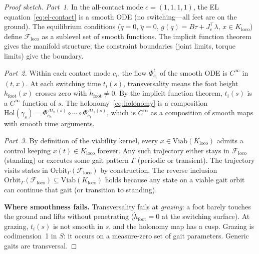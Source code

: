 \documentclass[11pt,a4paper]{article}
\newcommand{\cF}{\mathcal{F}}
\begin{document}
\begin{proof}[Proof sketch]
\emph{Part~1.}\;
In the all-contact mode $c = (1,1,1,1)$,
the EL equation~\eqref{eq:el-contact}
is a smooth ODE
(no switching---all feet are on the ground).
The equilibrium conditions
($\dot{q} = 0$, $\ddot{q} = 0$,
$g(q) = B\tau + J_c^\top\lambda$,
$x \in K_{\mathrm{loco}}$)
define $\cF_{\mathrm{loco}}$
as a sublevel set of smooth functions.
The implicit function theorem gives the manifold structure;
the constraint boundaries (joint limits, torque limits)
give the boundary.

\medskip\noindent
\emph{Part~2.}\;
Within each contact mode $c_i$,
the flow $\Phi_{c_i}^t$ of the smooth ODE
is $C^\infty$ in $(t, x)$.
At each switching time $t_i(s)$,
transversality means the foot height
$h_{\mathrm{foot}}(x)$ crosses zero
with $\dot{h}_{\mathrm{foot}} \neq 0$.
By the implicit function theorem,
$t_i(s)$ is a $C^\infty$ function of $s$.
The holonomy~\eqref{eq:holonomy}
is a composition
$\mathrm{Hol}(\gamma_s)
  = \Phi_{c_n}^{\Delta t_n(s)}
    \circ \cdots \circ
    \Phi_{c_1}^{\Delta t_1(s)}$,
which is $C^\infty$ as a composition
of smooth maps with smooth time arguments.

\medskip\noindent
\emph{Part~3.}\;
By definition of the viability kernel,
every $x \in \mathrm{Viab}(K_{\mathrm{loco}})$
admits a control keeping $x(t) \in K_{\mathrm{loco}}$
forever.
Any such trajectory either stays in
$\cF_{\mathrm{loco}}$ (standing)
or executes some gait pattern $\Gamma$
(periodic or transient).
The trajectory visits states in
$\mathrm{Orbit}_\Gamma(\cF_{\mathrm{loco}})$
by construction.
The reverse inclusion
$\mathrm{Orbit}_\Gamma(\cF_{\mathrm{loco}})
  \subseteq \mathrm{Viab}(K_{\mathrm{loco}})$
holds because any state on a viable gait orbit
can continue that gait
(or transition to standing).

\medskip\noindent
\textbf{Where smoothness fails.}\;
Transversality fails at \emph{grazing}:
a foot barely touches the ground and lifts
without penetrating
($\dot{h}_{\mathrm{foot}} = 0$
at the switching surface).
At grazing, $t_i(s)$ is not smooth in $s$,
and the holonomy map has a cusp.
Grazing is codimension~1 in $S$:
it occurs on a measure-zero set of gait parameters.
Generic gaits are transversal.
\end{proof}
\end{document}
